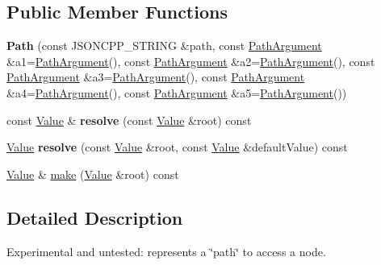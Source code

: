 \subsection*{Public Member Functions}
\begin{DoxyCompactItemize}
\item 
{\bfseries Path} (const J\+S\+O\+N\+C\+P\+P\+\_\+\+S\+T\+R\+I\+NG \&path, const \hyperlink{classJson_1_1PathArgument}{Path\+Argument} \&a1=\hyperlink{classJson_1_1PathArgument}{Path\+Argument}(), const \hyperlink{classJson_1_1PathArgument}{Path\+Argument} \&a2=\hyperlink{classJson_1_1PathArgument}{Path\+Argument}(), const \hyperlink{classJson_1_1PathArgument}{Path\+Argument} \&a3=\hyperlink{classJson_1_1PathArgument}{Path\+Argument}(), const \hyperlink{classJson_1_1PathArgument}{Path\+Argument} \&a4=\hyperlink{classJson_1_1PathArgument}{Path\+Argument}(), const \hyperlink{classJson_1_1PathArgument}{Path\+Argument} \&a5=\hyperlink{classJson_1_1PathArgument}{Path\+Argument}())\hypertarget{classJson_1_1Path_a7356c0e9c1fc2276390fd396271c1300}{}\label{classJson_1_1Path_a7356c0e9c1fc2276390fd396271c1300}

\item 
const \hyperlink{classJson_1_1Value}{Value} \& {\bfseries resolve} (const \hyperlink{classJson_1_1Value}{Value} \&root) const \hypertarget{classJson_1_1Path_ae1d05fa985a6ee3c57f2b8ed186b5982}{}\label{classJson_1_1Path_ae1d05fa985a6ee3c57f2b8ed186b5982}

\item 
\hyperlink{classJson_1_1Value}{Value} {\bfseries resolve} (const \hyperlink{classJson_1_1Value}{Value} \&root, const \hyperlink{classJson_1_1Value}{Value} \&default\+Value) const \hypertarget{classJson_1_1Path_a33d1749770a4cf74e9a3de419bc7febe}{}\label{classJson_1_1Path_a33d1749770a4cf74e9a3de419bc7febe}

\item 
\hyperlink{classJson_1_1Value}{Value} \& \hyperlink{classJson_1_1Path_a5289901fc58ad1fdca1de7fb5a0b620c}{make} (\hyperlink{classJson_1_1Value}{Value} \&root) const 
\end{DoxyCompactItemize}


\subsection{Detailed Description}
Experimental and untested\+: represents a \char`\"{}path\char`\"{} to access a node. 

